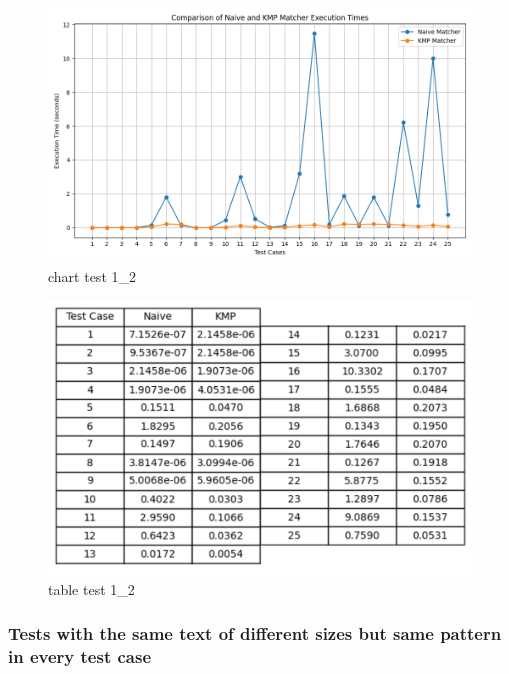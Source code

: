 \documentclass[11pt]{article}
\begin{document}
                \begin{figure}[H]
                    \centering
                    \includegraphics[width = \textwidth]{execution_times_1_2}
                    \caption{chart test 1\_2}
                    \label{fig:chart_test_1_2}
                \end{figure}

                \begin{figure}[H]
                    \centering
                    \includegraphics[width = 0.9 \textwidth]{table_execution_times_1_2 (1)}
                    \caption{table test 1\_2}
                    \label{fig:table_test_1_2}
                \end{figure}

            \newpage

            \subsubsection{Tests with the same text of different sizes but same pattern in every test case} \label{subsubsec:tests_2}
\end{document}
